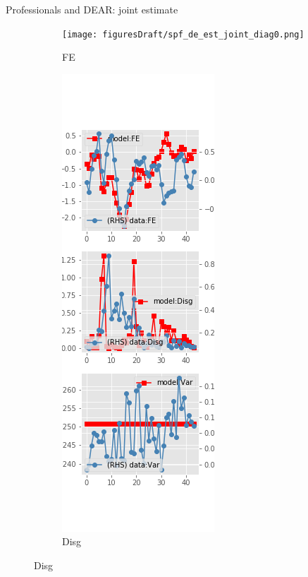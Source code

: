 \documentclass{beamer}
\begin{document}
\begin{frame}{Professionals and DEAR: joint estimate}
	\begin{figure}[ht]
		\label{DE_diag_joint_SPF}
		\begin{subfigure}[b]{0.2\textwidth}
			\centering
			\caption{FE}
			\texttt{[image: figuresDraft/spf\_de\_est\_joint\_diag0.png]}
		\end{subfigure}
		\hfill
		\begin{subfigure}[b]{0.2\textwidth}
			\caption{Disg}
			\includegraphics[width=\textwidth, height = 0.8\textheight]{figuresDraft/spf_de_est_joint_diag1.png}

\end{subfigure}
\end{figure}
\end{frame}
\end{document}
